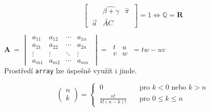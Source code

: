 \documentclass[11pt,a4paper,twocolumn]{article}
\theoremstyle{definition}
\begin{document}
    \[
    \begin{bmatrix}
      \  & \widehat{\beta + \gamma} & \hat{\pi}\ \\[0.3em]
      \ \vec{a} & \overleftrightarrow{AC} &\
    \end{bmatrix}=1 \Longleftrightarrow \mathbb{Q} =\textbf{R}
    \]


    \textbf{A}\ =
    $\begin{vmatrix}
      \ a_{11} & a_{12} & \cdots & a_{1n}\ \\
      \ a_{21} & a_{22} & \cdots & a_{2n}\ \\
      \ \vdots & \vdots & \ddots & \vdots\ \\
      \ a_{m1} & a_{m2} & \cdots & a_{mn}\
    \end{vmatrix}=\
    \begin{matrix}
      t & u \\
      v & w
    \end{matrix}\ =tw-uv$\\

    Prostředí \texttt{array} lze úspešně využít i jinde.

    \begin{equation*}
      \left(\!
        \begin{array}{c}
          n\\
          k
        \end{array}
    \!\right)=
    \begin{cases}
      \ 0 & \quad\text{pro } k < 0 \text{ nebo } k > n \\
      \ \frac{n!}{k!(n-k)!} & \quad\text{pro } 0\leq k\leq n
    \end{cases}
    \end{equation*}
\end{document}
